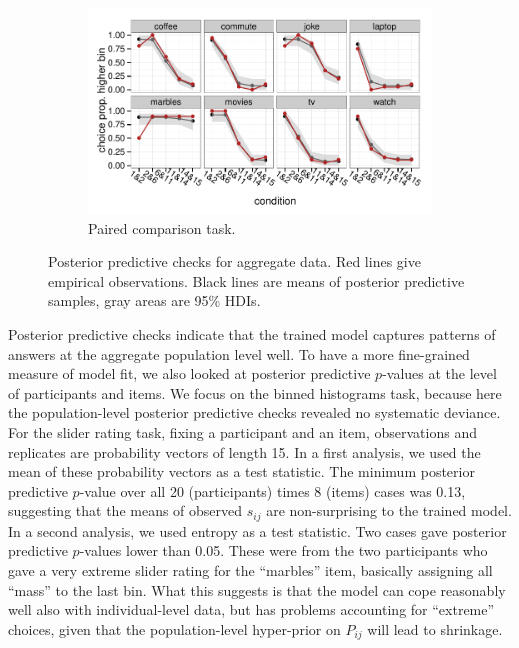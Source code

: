 \documentclass[10pt,letterpaper]{article}
\newcommand{\citep}[1]{\cite{#1}}
\begin{document}
\begin{figure}
  \begin{subfigure}[b]{0.5\textwidth}
    \includegraphics[width = \textwidth]{plots/ppc_choice.pdf}
    \caption{Paired comparison task.}
    \label{fig:lightingPPC}
  \end{subfigure}

  \caption{Posterior predictive checks for aggregate data. Red lines give empirical
    observations. Black lines are means of posterior predictive samples, gray areas are
    95\% HDIs.}
  \label{fig:PPCs}
\end{figure}

Posterior predictive checks indicate that the trained model captures patterns of answers at the
aggregate population level well. To have a more fine-grained measure of model fit, we also
looked at posterior predictive $p$-values \citep{GelmanCarlin2014:Bayesian-Data-A} at the level
of participants and items. We focus on the binned histograms task, because here the
population-level posterior predictive checks revealed no systematic deviance. For the slider
rating task, fixing a participant and an item, observations and replicates are probability
vectors of length 15. In a first analysis, we used the mean of these probability vectors as a
test statistic. The minimum posterior predictive $p$-value over all 20 (participants) times 8
(items) cases was 0.13, suggesting that the means of observed $s_{ij}$ are non-surprising to
the trained model. In a second analysis, we used entropy as a test statistic. Two cases gave
posterior predictive $p$-values lower than 0.05. These were from the two participants who gave
a very extreme slider rating for the ``marbles'' item, basically assigning all ``mass'' to the
last bin. What this suggests is that the model can cope reasonably well also with
individual-level data, but has problems accounting for ``extreme'' choices, given that the
population-level hyper-prior on $P_{ij}$ will lead to shrinkage.
\end{document}
